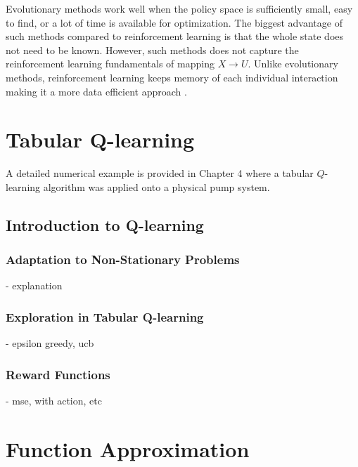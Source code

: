 Evolutionary methods work well when the policy space is sufficiently small, easy to find, or a lot of time is available for optimization.  The biggest advantage of such methods compared to reinforcement learning is that the whole state does not need to be known.  However, such methods does not capture the reinforcement learning fundamentals of mapping $X \rightarrow U$.  Unlike evolutionary methods, reinforcement learning keeps memory of each individual interaction making it a more data efficient approach \cite{sutton}.




\section{Tabular Q-learning}

A detailed numerical example is provided in Chapter 4 where a tabular $Q$-learning algorithm was applied onto a physical pump system.

\subsection{Introduction to Q-learning}
\subsubsection{Adaptation to Non-Stationary Problems}
- explanation
\subsubsection{Exploration in Tabular Q-learning}
- epsilon greedy, ucb
\subsubsection{Reward Functions}
- mse, with action, etc





\section{Function Approximation}
